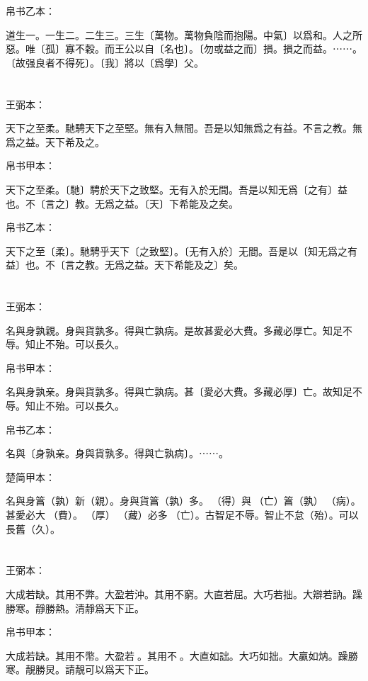 \documentclass[a5paper]{ctexbook}
\begin{document}
    帛书乙本：

    道生一。一生二。二生三。三生〔萬物。萬物負陰而抱陽。中氣〕以爲和。人之所惡。唯〔孤〕寡不穀。而王公以自〔名也〕。〔勿或益之而〕損。損之而益。⋯⋯。〔故强良者不得死〕。〔我〕將以〔爲學〕父。

    \chapter{}
    王弼本：

    天下之至柔。馳騁天下之至堅。無有入無間。吾是以知無爲之有益。不言之教。無爲之益。天下希及之。

    
    帛书甲本：

    天下之至柔。〔馳〕騁於天下之致堅。无有入於无間。吾是以知无爲〔之有〕益也。不〔言之〕教。无爲之益。〔天〕下希能及之矣。

    帛书乙本：

    天下之至〔柔〕。馳騁乎天下〔之致堅〕。〔无有入於〕无間。吾是以〔知无爲之有益〕也。不〔言之教。无爲之益。天下希能及之〕矣。

    \chapter{}
    王弼本：

    名與身孰親。身與貨孰多。得與亡孰病。是故甚愛必大費。多藏必厚亡。知足不辱。知止不殆。可以長久。

    
    帛书甲本：

    名與身孰亲。身與貨孰多。得與亡孰病。甚〔愛必大費。多藏必厚〕亡。故知足不辱。知止不殆。可以長久。

    帛书乙本：

    名與〔身孰亲。身與貨孰多。得與亡孰病〕。⋯⋯。

    楚简甲本：

    名與身䈞（孰）新（親）。身與貨䈞（孰）多。󰴼（得）與󶵔（亡）䈞（孰）󶓄（病）。甚愛必大󶵖（費）。󶵗（厚）󶤖（藏）必多󶵔（亡）。古智足不辱。智止不怠（殆）。可以長舊（久）。

    \chapter{}
    王弼本：

    大成若缺。其用不弊。大盈若沖。其用不窮。大直若屈。大巧若拙。大辯若訥。躁勝寒。靜勝熱。清靜爲天下正。

    
    帛书甲本：

    大成若缺。其用不幣。大盈若𥁵。其用不𡩫。大直如詘。大巧如拙。大贏如㶧。躁勝寒。靚勝炅。請靚可以爲天下正。
\end{document}
